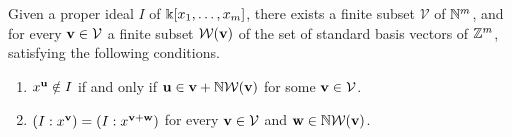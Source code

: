 \documentclass[11pt]{amsart}
\begin{document}
\begin{lemma}
\label{monomial-noetherian-decomposition: L}
Given a proper ideal $I$ of $\Bbbk[x_1, \ldots, x_m]$, there exists a finite subset $\mathcal{V}$ of $\mathbb{N}^m$, and for every $\mathbf{v} \in \mathcal{V}$ a finite subset $\mathcal{W}(\mathbf{v})$ of the set of standard basis vectors of $\mathbb{Z}^m$,  satisfying the following conditions.
\begin{enumerate}
\item $x^{\mathbf{u}} \notin I$ if and only if $\mathbf{u} \in \mathbf{v} + \mathbb{N} \mathcal{W}(\mathbf{v})$ for some $\mathbf{v} \in \mathcal{V}$.
\item $(I:x^{\mathbf{v}}) = (I: x^{\mathbf{v}+\mathbf{w}})$ for every $\mathbf{v} \in \mathcal{V}$ and $\mathbf{w} \in  \mathbb{N}  \mathcal{W}(\mathbf{v})$.
\end{enumerate}
\end{lemma}
\end{document}

